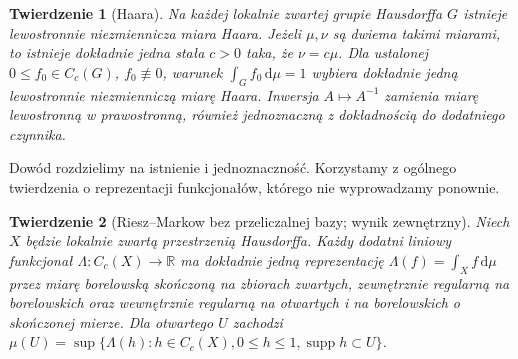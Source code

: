 \documentclass[11pt,a4paper]{article}
\numberwithin{equation}{section}
\theoremstyle{plain}
\newtheorem{twierdzenie}{Twierdzenie}[section]
\theoremstyle{definition}
\theoremstyle{remark}
\newcommand{\R}{\mathbb R}
\newcommand{\supp}{\operatorname{supp}}
\begin{document}
\begin{twierdzenie}[Haara]
Na każdej lokalnie zwartej grupie Hausdorffa $G$ istnieje lewostronnie niezmiennicza miara Haara. Jeżeli $\mu,\nu$ są dwiema takimi miarami, to istnieje dokładnie jedna stała $c>0$ taka, że $\nu=c\mu$. Dla ustalonej $0\le f_0\in C_c(G)$, $f_0\not\equiv0$, warunek $\int_G f_0\,\mathrm d\mu=1$ wybiera dokładnie jedną lewostronnie niezmienniczą miarę Haara. Inwersja $A\mapsto A^{-1}$ zamienia miarę lewostronną w prawostronną, również jednoznaczną z dokładnością do dodatniego czynnika.
\end{twierdzenie}
Dowód rozdzielimy na istnienie i jednoznaczność. Korzystamy z ogólnego twierdzenia o reprezentacji funkcjonałów, którego nie wyprowadzamy ponownie.
\begin{twierdzenie}[Riesz--Markow bez przeliczalnej bazy; wynik zewnętrzny]
Niech $X$ będzie lokalnie zwartą przestrzenią Hausdorffa. Każdy dodatni liniowy funkcjonał $\Lambda:C_c(X)\to\R$ ma dokładnie jedną reprezentację $\Lambda(f)=\int_X f\,\mathrm d\mu$ przez miarę borelowską skończoną na zbiorach zwartych, zewnętrznie regularną na borelowskich oraz wewnętrznie regularną na otwartych i na borelowskich o skończonej mierze. Dla otwartego $U$ zachodzi
$\mu(U)=\sup\{\Lambda(h):h\in C_c(X),0\le h\le1,\supp h\subset U\}$.
\end{twierdzenie}
\end{document}
